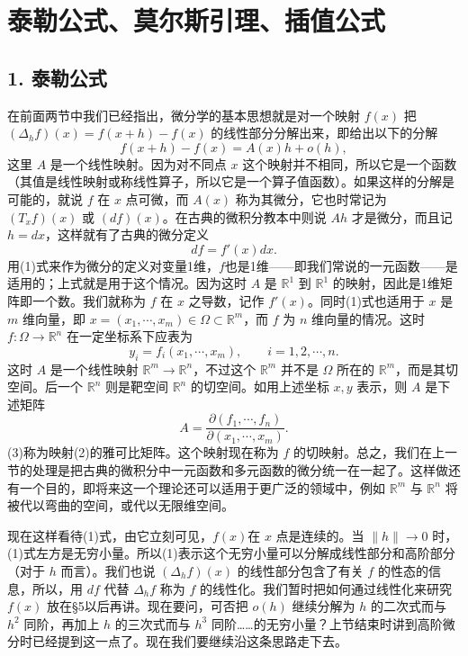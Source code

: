 \section{泰勒公式、莫尔斯引理、插值公式}

\subsection*{1. 泰勒公式}

在前面两节中我们已经指出，微分学的基本思想就是对一个映射 $f(x)$ 把 $(\Delta_hf)(x)=f(x+h)-f(x)$ 的线性部分分解出来，即给出以下的分解
\begin{equation}
 f(x+h)-f(x)=A(x)h+o(h),
 \tag{1}
\end{equation}
这里 $A$ 是一个线性映射。因为对不同点 $x$ 这个映射并不相同，所以它是一个函数（其值是线性映射或称线性算子，所以它是一个算子值函数）。如果这样的分解是可能的，就说 $f$ 在 $x$ 点可微，而 $A(x)$ 称为其微分，它也时常记为 $(T_xf)(x)$ 或 $(df)(x)$。在古典的微积分教本中则说 $Ah$ 才是微分，而且记 $h=dx$，这样就有了古典的微分定义
\[
 df=f'(x)dx.
\]
用(1)式来作为微分的定义对变量1维，$f$也是1维——即我们常说的一元函数——是适用的；上式就是用于这个情况。因为这时 $A$ 是 $\mathbb R^1$ 到 $\mathbb R^1$ 的映射，因此是1维矩阵即一个数。我们就称为 $f$ 在 $x$ 之导数，记作 $f'(x)$。同时(1)式也适用于 $x$ 是 $m$ 维向量，即 $x=(x_1,\cdots,x_m)\in\Omega\subset\mathbb R^m$，而 $f$ 为 $n$ 维向量的情况。这时 $f:\Omega\to\mathbb R^n$ 在一定坐标系下应表为
\begin{equation}
 y_i=f_i(x_1,\cdots,x_m),\qquad i=1,2,\cdots,n.
 \tag{2}
\end{equation}
这时 $A$ 是一个线性映射 $\mathbb R^m\to\mathbb R^n$，不过这个 $\mathbb R^m$ 并不是 $\Omega$ 所在的 $\mathbb R^m$，而是其切空间。后一个 $\mathbb R^n$ 则是靶空间 $\mathbb R^n$ 的切空间。如用上述坐标 $x,y$ 表示，则 $A$ 是下述矩阵
\begin{equation}
 A=\frac{\partial(f_1,\cdots,f_n)}{\partial(x_1,\cdots,x_m)}.
 \tag{3}
\end{equation}
(3)称为映射(2)的雅可比矩阵。这个映射现在称为 $f$ 的切映射。总之，我们在上一节的处理是把古典的微积分中一元函数和多元函数的微分统一在一起了。这样做还有一个目的，即将来这一个理论还可以适用于更广泛的领域中，例如 $\mathbb R^m$ 与 $\mathbb R^n$ 将被代以弯曲的空间，或代以无限维空间。

现在这样看待(1)式，由它立刻可见，$f(x)$在 $x$ 点是连续的。当 $\lVert h\rVert\to0$ 时，(1)式左方是无穷小量。所以(1)表示这个无穷小量可以分解成线性部分和高阶部分（对于 $h$ 而言）。我们也说 $(\Delta_hf)(x)$ 的线性部分包含了有关 $f$ 的性态的信息，所以，用 $df$ 代替 $\Delta_hf$ 称为 $f$ 的线性化。我们暂时把如何通过线性化来研究 $f(x)$ 放在§5以后再讲。现在要问，可否把 $o(h)$ 继续分解为 $h$ 的二次式而与 $h^2$ 同阶，再加上 $h$ 的三次式而与 $h^3$ 同阶……的无穷小量？上节结束时讲到高阶微分时已经提到这一点了。现在我们要继续沿这条思路走下去。

